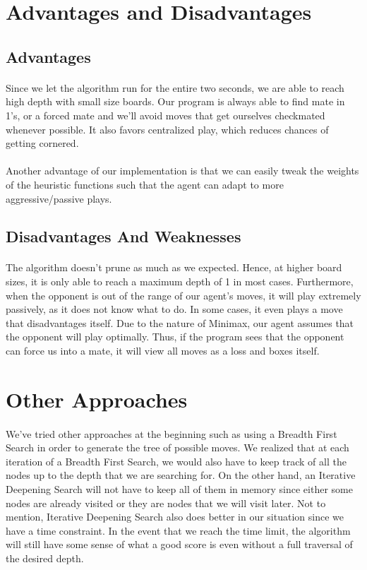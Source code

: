 \documentclass[12pt,a4paper]{article}
\begin{document}
\section{Advantages and Disadvantages}
\subsection{Advantages}
\paragraph{} Since we let the algorithm run for the entire two seconds, we are able to reach high depth with small size boards. 
Our program is always able to find mate in 1's, or a forced mate and we'll avoid moves that get ourselves 
checkmated whenever possible. 
It also favors centralized play, which reduces chances of getting cornered. 
\paragraph{} Another advantage of our implementation is that we can easily tweak the weights of the heuristic functions 
such that the agent can adapt to more aggressive/passive plays. 
\subsection{Disadvantages And Weaknesses}
\paragraph{} The algorithm doesn't prune as much as we expected. Hence, at higher board sizes, it is only able to reach a maximum 
depth of 1 in most cases. Furthermore, when the opponent is out of the range of our agent's moves, it will play extremely 
passively, as it does not know what to do. In some cases, it even plays a move that disadvantages itself. 
Due to the nature of Minimax, our agent assumes that the opponent will play 
optimally. Thus, if the program sees that the opponent can force us into a mate, it will view all 
moves as a loss and boxes itself. 

\section{Other Approaches}
\paragraph{} We've tried other approaches at the beginning such as using a Breadth First Search in order to generate the 
tree of possible moves. We realized that at each iteration of a Breadth First Search, 
we would also have to keep track of 
all the nodes up to the depth that we are searching for. On the other hand, an Iterative Deepening Search will not 
have to keep all of them in memory since either some nodes are already visited or they are nodes that we will 
visit later. Not to mention, Iterative Deepening Search also does better in our situation since we have a time 
constraint. In the event that we reach the time limit, the algorithm will still 
have some sense of what a good score is even without 
a full traversal of the desired depth. 
\end{document}
